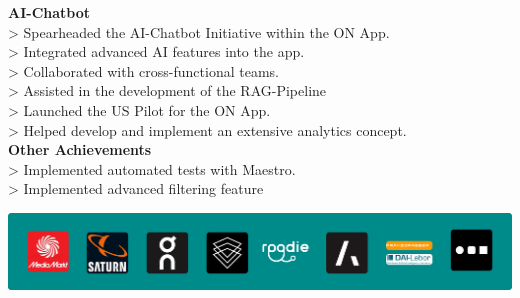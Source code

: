 \documentclass[10pt,a4paper,normalphoto]{altacv}
\begin{document}
\vspace{2em}



\textbf{AI-Chatbot}\\
> Spearheaded the AI-Chatbot Initiative within the ON App.\\
> Integrated advanced AI features into the app.\\
> Collaborated with cross-functional teams.\\
> Assisted in the development of the RAG-Pipeline \\
> Launched the US Pilot for the ON App.\\
> Helped develop and implement an extensive analytics concept.\\

\vspace{.5em}
\textbf{Other Achievements}\\
> Implemented automated tests with Maestro.\\
> Implemented advanced filtering feature 

\vspace{1em}


\vspace{2em}

\begin{center}
  \includegraphics[width=0.905\paperwidth]{company-logos-with-background.png}
\end{center}
\end{document}
